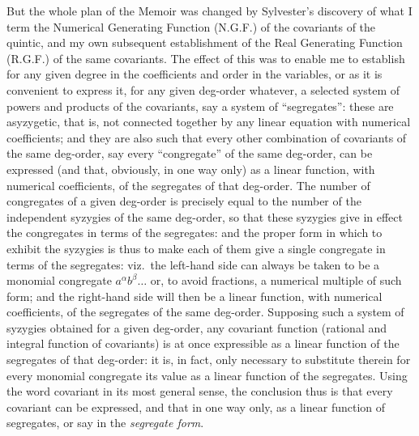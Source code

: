 \documentclass[11pt,a4paper]{book}
\begin{document}
But the whole plan of the Memoir was changed by Sylvester's discovery of what I term the Numerical Generating Function (N.G.F.) of the covariants of the quintic, and my own subsequent establishment of the Real Generating Function (R.G.F.) of the same covariants. The effect of this was to enable me to establish for any given degree in the coefficients and order in the variables, or as it is convenient to express it, for any given deg-order whatever, a selected system of powers and products of the covariants, say a system of ``segregates'': these are asyzygetic, that is, not connected together by any linear equation with numerical coefficients; and they are also such that every other combination of covariants of the same deg-order, say every ``congregate'' of the same deg-order, can be expressed (and that, obviously, in one way only) as a linear function, with numerical coefficients, of the segregates of that deg-order. The number of congregates of a given deg-order is precisely equal to the number of the independent syzygies of the same deg-order, so that these syzygies give in effect the congregates in terms of the segregates: and the proper form in which to exhibit the syzygies is thus to make each of them give a single congregate in terms of the segregates: viz.\ the left-hand side can always be taken to be a monomial congregate $a^\alpha b^\beta \ldots$ or, to avoid fractions, a numerical multiple of such form; and the right-hand side will then be a linear function, with numerical coefficients, of the segregates of the same deg-order. Supposing such a system of syzygies obtained for a given deg-order, any covariant function (rational and integral function of covariants) is at once expressible as a linear function of the segregates of that deg-order: it is, in fact, only necessary to substitute therein for every monomial congregate its value as a linear function of the segregates. Using the word covariant in its most general sense, the conclusion thus is that every covariant can be expressed, and that in one way only, as a linear function of segregates, or say in the \textit{segregate form}.
\end{document}
